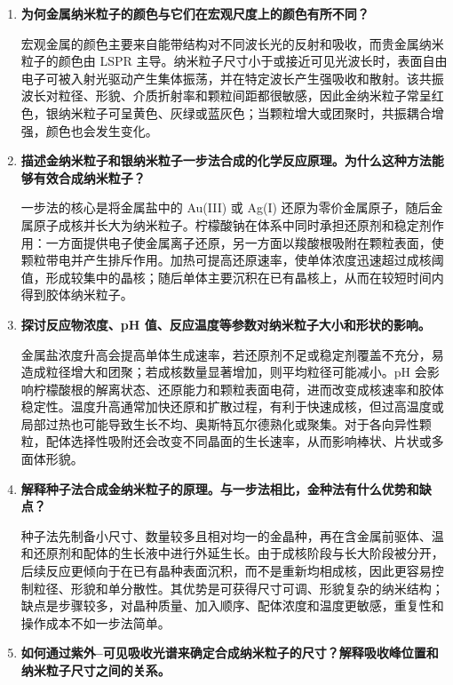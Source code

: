 \documentclass[a4paper]{article}
\begin{document}
\begin{enumerate}[label=\textbf{\arabic*.},leftmargin=2.5em]
  \item \textbf{为何金属纳米粒子的颜色与它们在宏观尺度上的颜色有所不同？}

        宏观金属的颜色主要来自能带结构对不同波长光的反射和吸收，而贵金属纳米粒子的颜色由 LSPR 主导。纳米粒子尺寸小于或接近可见光波长时，表面自由电子可被入射光驱动产生集体振荡，并在特定波长产生强吸收和散射。该共振波长对粒径、形貌、介质折射率和颗粒间距都很敏感，因此金纳米粒子常呈红色，银纳米粒子可呈黄色、灰绿或蓝灰色；当颗粒增大或团聚时，共振耦合增强，颜色也会发生变化。

  \item \textbf{描述金纳米粒子和银纳米粒子一步法合成的化学反应原理。为什么这种方法能够有效合成纳米粒子？}

        一步法的核心是将金属盐中的 Au(III) 或 Ag(I) 还原为零价金属原子，随后金属原子成核并长大为纳米粒子。柠檬酸钠在体系中同时承担还原剂和稳定剂作用：一方面提供电子使金属离子还原，另一方面以羧酸根吸附在颗粒表面，使颗粒带电并产生排斥作用。加热可提高还原速率，使单体浓度迅速超过成核阈值，形成较集中的晶核；随后单体主要沉积在已有晶核上，从而在较短时间内得到胶体纳米粒子。

  \item \textbf{探讨反应物浓度、pH 值、反应温度等参数对纳米粒子大小和形状的影响。}

        金属盐浓度升高会提高单体生成速率，若还原剂不足或稳定剂覆盖不充分，易造成粒径增大和团聚；若成核数量显著增加，则平均粒径可能减小。pH 会影响柠檬酸根的解离状态、还原能力和颗粒表面电荷，进而改变成核速率和胶体稳定性。温度升高通常加快还原和扩散过程，有利于快速成核，但过高温度或局部过热也可能导致生长不均、奥斯特瓦尔德熟化或聚集。对于各向异性颗粒，配体选择性吸附还会改变不同晶面的生长速率，从而影响棒状、片状或多面体形貌。

  \item \textbf{解释种子法合成金纳米粒子的原理。与一步法相比，金种法有什么优势和缺点？}

        种子法先制备小尺寸、数量较多且相对均一的金晶种，再在含金属前驱体、温和还原剂和配体的生长液中进行外延生长。由于成核阶段与长大阶段被分开，后续反应更倾向于在已有晶种表面沉积，而不是重新均相成核，因此更容易控制粒径、形貌和单分散性。其优势是可获得尺寸可调、形貌复杂的纳米结构；缺点是步骤较多，对晶种质量、加入顺序、配体浓度和温度更敏感，重复性和操作成本不如一步法简单。

  \item \textbf{如何通过紫外--可见吸收光谱来确定合成纳米粒子的尺寸？解释吸收峰位置和纳米粒子尺寸之间的关系。}


\end{enumerate}
\end{document}
